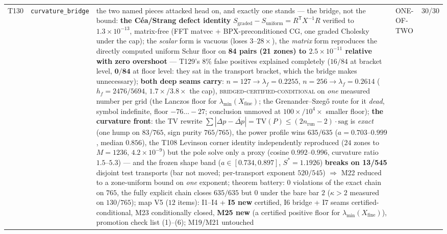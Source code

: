 \documentclass[11pt,a4paper]{article}
\begin{document}
{\begin{xltabular}{\linewidth}{@{}p{0.95cm} >{\raggedright\arraybackslash}p{3.1cm} Y >{\raggedright\scriptsize\arraybackslash}p{3.35cm} p{1.15cm}@{}}
T130 & \texttt{\scriptsize curvature\_\allowbreak bridge} & the two named pieces attacked head on, and exactly one stands --- the bridge, not the bound: \textbf{the C\'ea/Strang defect identity} $S_{\mathrm{graded}}-S_{\mathrm{uniform}}=R^{\mathsf T}X^{-1}R$ verified to $1.3\times10^{-13}$, matrix-free (FFT matvec + BPX-preconditioned CG, one graded Cholesky under the cap); the \emph{scalar} form is vacuous (loses $3$--$28\times$), the \emph{matrix} form reproduces the directly computed uniform Schur floor on \textbf{84 pairs (21 zones) to $2.5\times10^{-11}$ relative with zero overshoot} --- T129's $8\%$ false positives explained completely ($16/84$ at bracket level, $\mathbf{0/84}$ at floor level: they sat in the transport bracket, which the bridge makes unnecessary); \textbf{both deep seams carry}: $n=127\to\lambda_f=0.2255$, $n=256\to\lambda_f=0.2614$ ($h_f=2476/5694$, $1.7\times/3.8\times$ the cap), \textsc{bridged-certified-conditional} on \emph{one} measured number per grid (the Lanczos floor for $\lambda_{\min}(X_{\mathrm{fine}})$; the Grenander--Szeg\H{o} route for it \emph{dead}, symbol indefinite, floor $-76\ldots-27$; conclusion unmoved at $100\times/10^4\times$ smaller floor); \textbf{the curvature front}: the TV rewrite $\sum|\Delta p-\overline{\Delta p}|=\mathrm{TV}(P)\le(2n_{\mathrm{run}}-2)\cdot\mathrm{sag}$ is \emph{exact} (one hump on $83/765$, sign purity $765/765$), the power profile wins $635/635$ ($a=0.703$--$0.999$, median $0.856$), the T108 Levinson corner identity independently reproduced ($24$ zones to $M=1236$, $4.2\times10^{-9}$) but the pole solve only a proxy (cosine $0.992$--$0.996$, curvature ratio $1.5$--$5.3$) --- and the frozen shape band ($a\in[0.734,0.897]$, $S^*=1.1926$) \textbf{breaks on 13/545} disjoint test transports (bar not moved; per-transport exponent $520/545$) $\Rightarrow$ M22 reduced to a zone-uniform bound on \emph{one} exponent; theorem battery: $0$ violations of the exact chain on $765$, the fully explicit chain closes $635/635$ but $0$ under the bare bar $2$ ($\kappa>2$ measured on $130/765$); map V5 ($12$ items): I1--I4 + \textbf{I5 new} certified, I6 bridge + I7 seams certified-conditional, M23 conditionally closed, \textbf{M25 new} (a certified positive floor for $\lambda_{\min}(X_{\mathrm{fine}})$), promotion check list (1)--(6); M19/M21 untouched & ONE-OF-TWO & 30/30\\

\end{xltabular}}
\end{document}
